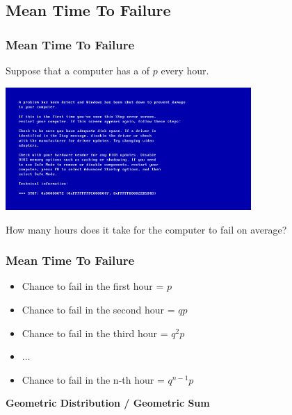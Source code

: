 \documentclass{beamer}
\begin{document}
\subsection{Mean Time To Failure}
\begin{frame}
  \frametitle{Mean Time To Failure}

  Suppose that a computer has a  of $p$ every hour.

  \bigskip
  
  \begin{center}
    \includegraphics[width=0.7\textwidth]{../img/bsod}
  \end{center}

  \bigskip

  \alert{How many hours} does it take for the computer to fail on average?
\end{frame}

\begin{frame}
  \frametitle{Mean Time To Failure}

  \begin{itemize}
  \item Chance to fail \alert{in the first hour} = $p$
  \item Chance to fail \alert{in the second hour} = $qp$
  \item Chance to fail \alert{in the third hour}  = $q^2p$
  \item $\ldots$
  \item Chance to fail \alert{in the n-th hour} = $q^{n-1}p$
  \end{itemize}

  \vfill

  \begin{center}
    {\bf Geometric Distribution / Geometric Sum}
  \end{center}
  
\end{frame}
\end{document}
